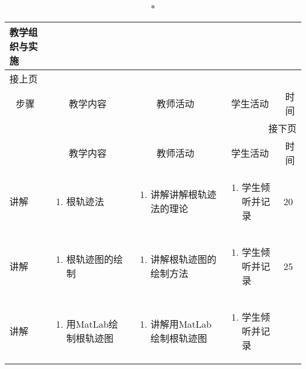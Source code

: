 {%
\begin{landscape}

\begin{longtable}{|m{10mm}|m{50mm}|m{50mm}|m{50mm}|m{15mm}|}
\caption*{\huge 教学组织与实施}\\
\hline
\endfirsthead
\multicolumn{5}{l}{\small 接上页}\\
\hline
\multicolumn{1}{|c|}{步骤}&\multicolumn{1}{c|}{教学内容}&\multicolumn{1}{c|}{教师活动}&\multicolumn{1}{c|}{学生活动}&\multicolumn{1}{c|}{时间}\\
\hline
\endhead

\multicolumn{5}{r}{\small 接下页}\\
\endfoot
\hline
\endlastfoot
\multicolumn{1}{|c|}{步骤}&\multicolumn{1}{c|}{教学内容}&\multicolumn{1}{c|}{教师活动}&\multicolumn{1}{c|}{学生活动}&\multicolumn{1}{c|}{时间}\\\hline
讲解&\begin{enumerate}
\item 根轨迹法
\end{enumerate} &\begin{enumerate}
\item 讲解讲解根轨迹法的理论
\end{enumerate} &\begin{enumerate}
\item 学生倾听并记录
\end{enumerate} &20 \\\hline
讲解&\begin{enumerate}
\item 根轨迹图的绘制
\end{enumerate}
 &\begin{enumerate}
\item 讲解根轨迹图的绘制方法
\end{enumerate} &\begin{enumerate}
\item 学生倾听并记录
\end{enumerate} &25 \\\hline
讲解&\begin{enumerate}
\item 用MatLab绘制根轨迹图
\end{enumerate}
&\begin{enumerate}
\item 讲解用MatLab绘制根轨迹图
\end{enumerate} &\begin{enumerate}
\item 学生倾听并记录

\end{enumerate}
\end{longtable}
\end{landscape}}
